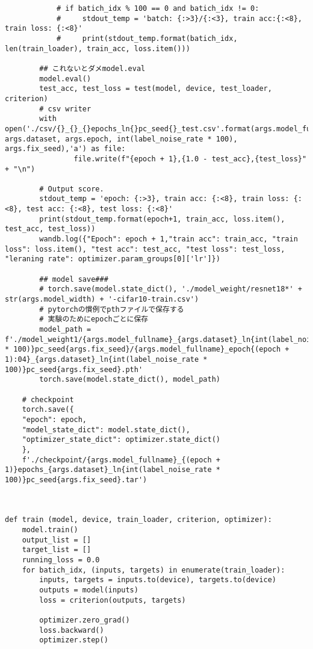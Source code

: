 {\begin{verbatim}
            # if batich_idx % 100 == 0 and batich_idx != 0:
            #     stdout_temp = 'batch: {:>3}/{:<3}, train acc:{:<8}, train loss: {:<8}'
            #     print(stdout_temp.format(batich_idx, len(train_loader), train_acc, loss.item()))

        ## これないとダメmodel.eval
        model.eval()
        test_acc, test_loss = test(model, device, test_loader, criterion)
        # csv writer
        with open('./csv/{}_{}_{}epochs_ln{}pc_seed{}_test.csv'.format(args.model_fullname, args.dataset, args.epoch, int(label_noise_rate * 100), args.fix_seed),'a') as file:
                file.write(f"{epoch + 1},{1.0 - test_acc},{test_loss}" + "\n")

        # Output score.
        stdout_temp = 'epoch: {:>3}, train acc: {:<8}, train loss: {:<8}, test acc: {:<8}, test loss: {:<8}'
        print(stdout_temp.format(epoch+1, train_acc, loss.item(), test_acc, test_loss))
        wandb.log({"Epoch": epoch + 1,"train acc": train_acc, "train loss": loss.item(), "test acc": test_acc, "test loss": test_loss, "leraning rate": optimizer.param_groups[0]['lr']})

        ## model save###
        # torch.save(model.state_dict(), './model_weight/resnet18*' + str(args.model_width) + '-cifar10-train.csv')
        # pytorchの慣例でpthファイルで保存する
        # 実験のためにepochごとに保存
        model_path = f'./model_weight1/{args.model_fullname}_{args.dataset}_ln{int(label_noise_rate * 100)}pc_seed{args.fix_seed}/{args.model_fullname}_epoch{(epoch + 1):04}_{args.dataset}_ln{int(label_noise_rate * 100)}pc_seed{args.fix_seed}.pth'
        torch.save(model.state_dict(), model_path)
    
    # checkpoint
    torch.save({
    "epoch": epoch,
    "model_state_dict": model.state_dict(),
    "optimizer_state_dict": optimizer.state_dict()
    }, 
    f'./checkpoint/{args.model_fullname}_{(epoch + 1)}epochs_{args.dataset}_ln{int(label_noise_rate * 100)}pc_seed{args.fix_seed}.tar')
    
    

def train (model, device, train_loader, criterion, optimizer):
    model.train()
    output_list = []
    target_list = []
    running_loss = 0.0
    for batich_idx, (inputs, targets) in enumerate(train_loader):
        inputs, targets = inputs.to(device), targets.to(device)
        outputs = model(inputs)
        loss = criterion(outputs, targets)

        optimizer.zero_grad()
        loss.backward()
        optimizer.step()


\end{verbatim}}

